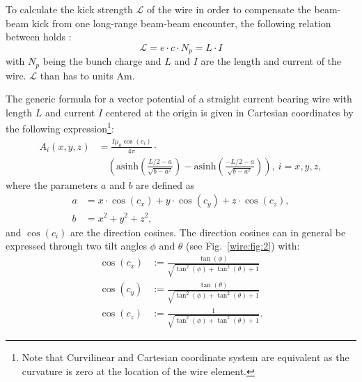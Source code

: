 \documentclass[english]{article}
\def\asinh{\mathrm{asinh}}
\begin{document}
To calculate the kick strength $\mathcal{L}$ of the wire in order to compensate the beam-beam kick from one long-range beam-beam encounter, the following relation between holds \cite{Valishev:wire}:
\begin{equation}
	\mathcal{L}=e\cdot c\cdot N_p=L\cdot I
\end{equation}
with $N_p$ being the bunch charge and $L$ and $I$ are the length and current of the wire. $\mathcal{L}$ than has to units Am.

The generic formula for a vector potential of a straight current bearing wire with length $L$ and current $I$ centered at the origin is given in Cartesian coordinates by the following expression\footnote{Note that Curvilinear and Cartesian coordinate system are equivalent as the curvature is zero at the location of the wire element.}: 
\begin{align}\label{wire:eqn:1}
	{A_i(x,y,z)} &=\frac{I\mu_0\cos(c_i)}{4\pi}\cdot\nonumber\\
	&\quad \left(\asinh\left(\frac{L/2-a}{\sqrt{b-a^2}}\right)-\asinh\left(\frac{-L/2-a}{\sqrt{b-a^2}}\right)\right), \ i=x,y,z, 
\end{align}
where the parameters $a$ and $b$ are defined as
\begin{align}\label{wire:eqn:2}
a&=x\cdot\cos(c_x)+y\cdot\cos(c_y)+z\cdot\cos(c_z), \\
b&=x^2+y^2+z^2,
\end{align}
and $\cos(c_i)$ are the direction cosines. The direction cosines can in general be expressed through two tilt angles $\phi$ and $\theta$ (see Fig.~\ref{wire:fig:2}) with:
\begin{align}\label{wire:eqn:3}
\cos(c_x)  &:= \frac{\tan({\phi})}{\sqrt{\tan^2({\phi})+\tan^2({\theta})+1}} \nonumber\\
\cos(c_y)  &:= \frac{\tan({\theta})}{\sqrt{\tan^2({\phi})+\tan^2({\theta})+1}} \\
\cos(c_z)  &:= \frac{1}{\sqrt{\tan^2({\phi})+\tan^2({\theta})+1}}.\nonumber
\end{align}
\end{document}
